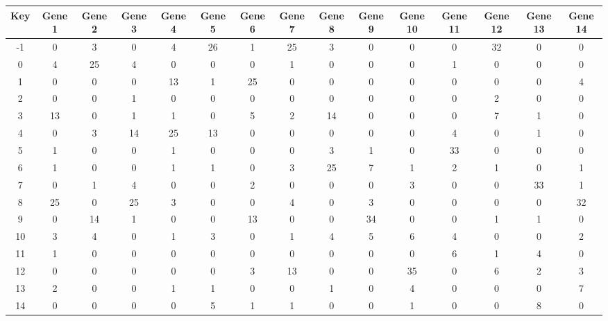 \begin{tabular}{|c|c|c|c|c|c|c|c|c|c|c|c|c|c|c|}
\hline
Key & Gene 1 & Gene 2 & Gene 3 & Gene 4 & Gene 5 & Gene 6 & Gene 7 & Gene 8 & Gene 9 & Gene 10 & Gene 11 & Gene 12 & Gene 13 & Gene 14 \\
\hline
-1 & 0 & 3 & 0 & 4 & 26 & 1 & 25 & 3 & 0 & 0 & 0 & 32 & 0 & 0 \\
0 & 4 & 25 & 4 & 0 & 0 & 0 & 1 & 0 & 0 & 0 & 1 & 0 & 0 & 0 \\
1 & 0 & 0 & 0 & 13 & 1 & 25 & 0 & 0 & 0 & 0 & 0 & 0 & 0 & 4 \\
2 & 0 & 0 & 1 & 0 & 0 & 0 & 0 & 0 & 0 & 0 & 0 & 2 & 0 & 0 \\
3 & 13 & 0 & 1 & 1 & 0 & 5 & 2 & 14 & 0 & 0 & 0 & 7 & 1 & 0 \\
4 & 0 & 3 & 14 & 25 & 13 & 0 & 0 & 0 & 0 & 0 & 4 & 0 & 1 & 0 \\
5 & 1 & 0 & 0 & 1 & 0 & 0 & 0 & 3 & 1 & 0 & 33 & 0 & 0 & 0 \\
6 & 1 & 0 & 0 & 1 & 1 & 0 & 3 & 25 & 7 & 1 & 2 & 1 & 0 & 1 \\
7 & 0 & 1 & 4 & 0 & 0 & 2 & 0 & 0 & 0 & 3 & 0 & 0 & 33 & 1 \\
8 & 25 & 0 & 25 & 3 & 0 & 0 & 4 & 0 & 3 & 0 & 0 & 0 & 0 & 32 \\
9 & 0 & 14 & 1 & 0 & 0 & 13 & 0 & 0 & 34 & 0 & 0 & 1 & 1 & 0 \\
10 & 3 & 4 & 0 & 1 & 3 & 0 & 1 & 4 & 5 & 6 & 4 & 0 & 0 & 2 \\
11 & 1 & 0 & 0 & 0 & 0 & 0 & 0 & 0 & 0 & 0 & 6 & 1 & 4 & 0 \\
12 & 0 & 0 & 0 & 0 & 0 & 3 & 13 & 0 & 0 & 35 & 0 & 6 & 2 & 3 \\
13 & 2 & 0 & 0 & 1 & 1 & 0 & 0 & 1 & 0 & 4 & 0 & 0 & 0 & 7 \\
14 & 0 & 0 & 0 & 0 & 5 & 1 & 1 & 0 & 0 & 1 & 0 & 0 & 8 & 0 \\
\hline
\end{tabular}